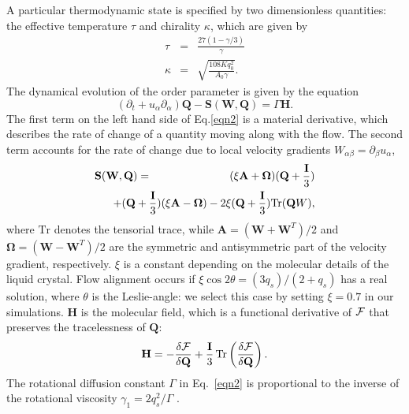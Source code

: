 \documentclass[aps,pre,reprint,superscriptaddress]{revtex4}
\begin{document}
A particular thermodynamic state is specified by two dimensionless quantities: the effective temperature $\tau$ and chirality $\kappa$,
which are given by
\begin{eqnarray}
\tau&=&\frac{27(1-\gamma/3)}{\gamma}\nonumber\\
\kappa&=&\sqrt{\frac{108 K q_0^2}{A_0 \gamma}}\nonumber.
\end{eqnarray}
The dynamical evolution of the order parameter is given by the equation 
\begin{equation}
\left(\partial_t+ u_\alpha \partial_\alpha \right){\mathbf Q} - {\mathbf S}({\mathbf W},{\mathbf Q}) = \Gamma {\mathbf H}.
\label{eqn2}
\end{equation}
The first term on the left hand side of Eq.\ref{eqn2} is a material derivative, which describes the rate of change of a quantity moving along with the flow.
The second term accounts for the rate of change due to local velocity gradients $W_{\alpha \beta}=\partial_\beta u_\alpha$,
\begin{eqnarray}
{\mathbf S}({\mathbf W}, {\mathbf Q}) &=& (\xi {\mathbf A} + {\boldsymbol \Omega})({\mathbf Q}+\frac{\mathbf I}{3})\nonumber\\
& &\hspace*{-1.5cm}+ ({\mathbf Q}+\frac{\mathbf I}{3})(\xi {\mathbf A}  - {\boldsymbol \Omega})-2 \xi ({\mathbf Q}+\frac{\mathbf I}{3})
\mathrm{Tr}({\mathbf Q W}),
\label{eqn3}
\end{eqnarray}
where $\mathrm{Tr}$ denotes the tensorial trace, while 
${\mathbf A}=({\mathbf W}+{\mathbf W}^T)/2$ and
${\boldsymbol \Omega}=({\mathbf W}-{\mathbf W}^T)/2$ are the symmetric and antisymmetric part of the velocity gradient, respectively. $\xi$ 
is a constant depending on the molecular details of the liquid crystal.
Flow alignment occurs if $\xi \cos{2\theta}=(3q_s)/(2+q_s)$ has a real solution, where $\theta$ is the Leslie-angle: we select this case by 
setting $\xi=0.7$ in our simulations.
${\mathbf H}$ is the molecular field, which is a functional derivative of $\cal F$ that preserves the tracelessness of $\mathbf Q$:
\begin{equation}
{\bf H}=-\frac{\delta {\cal F}}{\delta {\bf Q}}+\frac{\bf I}{3}\,
\mathrm{Tr} \left(\frac{\delta {\cal F}}{\delta {\bf Q}}\right).
\label{eqn4}
\end{equation}
The rotational diffusion constant $\Gamma$ in Eq.~\ref{eqn2} is proportional
to the inverse of the rotational viscosity $\gamma_1=2 q_s^2/\Gamma$
\cite{deGennes}.
\end{document}
